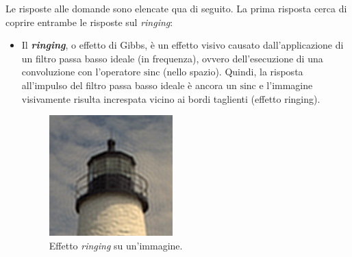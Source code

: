 \documentclass[a4paper]{article}
\begin{document}
	Le risposte alle domande sono elencate qua di seguito. La prima risposta cerca di coprire entrambe le risposte sul \emph{ringing}:
	\begin{itemize}
		\item Il \emph{\textbf{ringing}}, o effetto di Gibbs, è un effetto visivo causato dall'applicazione di un filtro passa basso ideale (in frequenza), ovvero dell'esecuzione di una convoluzione con l'operatore $\mathrm{sinc}$ (nello spazio). Quindi, la risposta all'impulso del filtro passa basso ideale è ancora un $\mathrm{sinc}$ e l'immagine visivamente risulta increspata vicino ai bordi taglienti (effetto ringing).\newline
		\begin{figure}[!htp]
			\centering
			\includegraphics[width=.4\textwidth]{img/ringing.PNG}
			\caption*{Effetto \emph{ringing} su un'immagine.}
		\end{figure}
	

\end{itemize}
\end{document}
